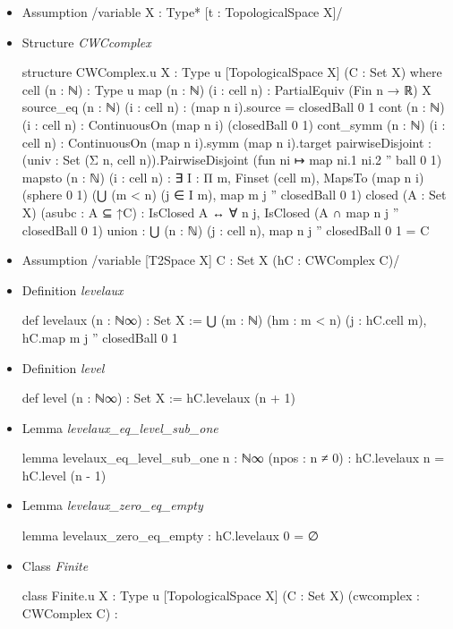 \documentclass[colorinlistoftodos]{article}
\newcommand{\todonoturgentinline}[1]{\todo[inline, color=yellow]{#1}}
\begin{document}
\begin{itemize}
  \item Assumption \lean /variable {X : Type*} [t : TopologicalSpace X]/
  \item Structure \emph{CWCcomplex}
\begin{leancode}
structure CWComplex.{u} {X : Type u} [TopologicalSpace X] (C : Set X) where
  cell (n : ℕ) : Type u
  map (n : ℕ) (i : cell n) : PartialEquiv (Fin n → ℝ) X
  source_eq (n : ℕ) (i : cell n) : (map n i).source = closedBall 0 1
  cont (n : ℕ) (i : cell n) : ContinuousOn (map n i) (closedBall 0 1)
  cont_symm (n : ℕ) (i : cell n) : ContinuousOn (map n i).symm (map n i).target
  pairwiseDisjoint :
    (univ : Set (Σ n, cell n)).PairwiseDisjoint (fun ni ↦ map ni.1 ni.2 '' ball 0 1)
  mapsto (n : ℕ) (i : cell n) : ∃ I : Π m, Finset (cell m),
    MapsTo (map n i) (sphere 0 1) (⋃ (m < n) (j ∈ I m), map m j '' closedBall 0 1)
  closed (A : Set X) (asubc : A ⊆ ↑C) : 
    IsClosed A ↔ ∀ n j, IsClosed (A ∩ map n j '' closedBall 0 1)
  union : ⋃ (n : ℕ) (j : cell n), map n j '' closedBall 0 1 = C
\end{leancode}
  \item Assumption \lean /variable [T2Space X] {C : Set X} (hC : CWComplex C)/
  \item Definition \emph{levelaux}
\begin{leancode}
def levelaux (n : ℕ∞) : Set X :=
  ⋃ (m : ℕ) (hm : m < n) (j : hC.cell m), hC.map m j '' closedBall 0 1
\end{leancode}
  \item Definition \emph{level}
\begin{leancode}
def level (n : ℕ∞) : Set X :=
  hC.levelaux (n + 1)
\end{leancode}
  \item Lemma \emph{levelaux\_eq\_level\_sub\_one}
\begin{leancode}
lemma levelaux_eq_level_sub_one {n : ℕ∞} (npos : n ≠ 0) : hC.levelaux n = hC.level (n - 1)
\end{leancode}
  \item Lemma \emph{levelaux\_zero\_eq\_empty}
\begin{leancode}
lemma levelaux_zero_eq_empty : hC.levelaux 0 = ∅
\end{leancode}
\todonoturgentinline{Add CW-Complex of finite type}
  \item Class \emph{Finite}
\begin{leancode}
class Finite.{u} {X : Type u} [TopologicalSpace X] (C : Set X) (cwcomplex : CWComplex C) :

\end{leancode}
\end{itemize}
\end{document}
